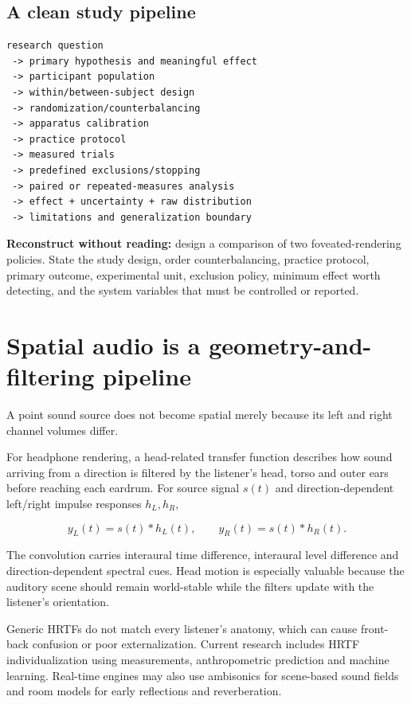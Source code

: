 \subsection{A clean study pipeline}\label{04-visual-computing-ii-ch035-a-clean-study-pipeline}

\begin{verbatim}
research question
 -> primary hypothesis and meaningful effect
 -> participant population
 -> within/between-subject design
 -> randomization/counterbalancing
 -> apparatus calibration
 -> practice protocol
 -> measured trials
 -> predefined exclusions/stopping
 -> paired or repeated-measures analysis
 -> effect + uncertainty + raw distribution
 -> limitations and generalization boundary
\end{verbatim}

\textbf{Reconstruct without reading:} design a comparison of two foveated-rendering policies. State the study design, order counterbalancing, practice protocol, primary outcome, experimental unit, exclusion policy, minimum effect worth detecting, and the system variables that must be controlled or reported.

\section{Spatial audio is a geometry-and-filtering pipeline}\label{04-visual-computing-ii-ch035-spatial-audio-is-a-geometry-and-filtering-pipeline}

A point sound source does not become spatial merely because its left and right channel volumes differ.

For headphone rendering, a head-related transfer function describes how sound arriving from a direction is filtered by the listener's head, torso and outer ears before reaching each eardrum. For source signal \(s(t)\) and direction-dependent left/right impulse responses \(h_L,h_R\),

\[
y_L(t)=s(t)*h_L(t),\qquad
y_R(t)=s(t)*h_R(t).
\]

The convolution carries interaural time difference, interaural level difference and direction-dependent spectral cues. Head motion is especially valuable because the auditory scene should remain world-stable while the filters update with the listener's orientation.

Generic HRTFs do not match every listener's anatomy, which can cause front-back confusion or poor externalization. Current research includes HRTF individualization using measurements, anthropometric prediction and machine learning. Real-time engines may also use ambisonics for scene-based sound fields and room models for early reflections and reverberation.

